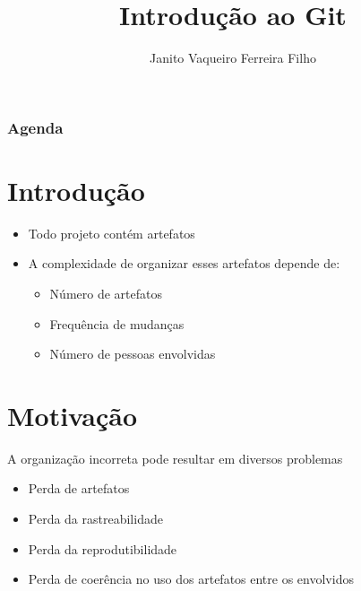 \documentclass{beamer}
\title{Introdução ao Git}
\author{Janito Vaqueiro Ferreira Filho}
\institute{Universidade Estadual de Campinas}
\newenvironment{slide}{\begin{frame}{\insertsection}}{\end{frame}}
\begin{document}
\begin{frame}
    \titlepage
\end{frame}

\begin{frame}
    \frametitle{Agenda}
    \tableofcontents
\end{frame}

\section{Introdução}
\begin{slide}
    \begin{itemize}
        \item Todo projeto contém artefatos
        \pause
        \item A complexidade de organizar esses artefatos depende de:
        \pause
            \begin{itemize}
                \item Número de artefatos
                \pause
                \item Frequência de mudanças
                \pause
                \item Número de pessoas envolvidas
            \end{itemize}
    \end{itemize}
\end{slide}

\section{Motivação}
\begin{slide}
    A organização incorreta pode resultar em diversos problemas
    \begin{itemize}
        \pause
        \item Perda de artefatos
        \pause
        \item Perda da rastreabilidade
        \pause
        \item Perda da reprodutibilidade
        \pause
        \item Perda de coerência no uso dos artefatos entre os envolvidos
    \end{itemize}
\end{slide}
\end{document}
